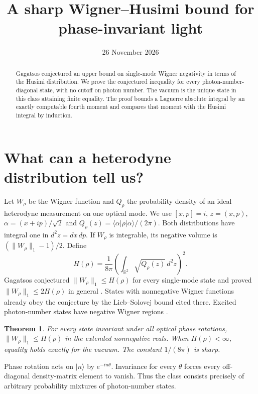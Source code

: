 \documentclass[11pt]{article}
\title{A sharp Wigner--Husimi bound for phase-invariant light}
\date{26 November 2026}
\newtheorem{theorem}{Theorem}
\newcommand{\R}{\mathbb R}
\newcommand{\ket}[1]{\lvert #1\rangle}
\begin{document}
\maketitle
\begin{abstract}
Gagatsos conjectured an upper bound on single-mode Wigner negativity in terms of the Husimi distribution. We prove the conjectured inequality for every photon-number-diagonal state, with no cutoff on photon number. The vacuum is the unique state in this class attaining finite equality. The proof bounds a Laguerre absolute integral by an exactly computable fourth moment and compares that moment with the Husimi integral by induction.
\end{abstract}

\section{What can a heterodyne distribution tell us?}
Let $W_\rho$ be the Wigner function and $Q_\rho$ the probability density of an ideal heterodyne measurement on one optical mode. We use $[x,p]=i$, $z=(x,p)$, $\alpha=(x+ip)/\sqrt{2}$ and $Q_\rho(z)=\langle\alpha|\rho|\alpha\rangle/(2\pi)$. Both distributions have integral one in $d^2z=dx\,dp$. If $W_\rho$ is integrable, its negative volume is $(\|W_\rho\|_1-1)/2$. Define
\[
 H(\rho)=\frac{1}{8\pi}\left(\int_{\R^2}\sqrt{Q_\rho(z)}\,d^2z\right)^2.
\]
Gagatsos conjectured $\|W_\rho\|_1\le H(\rho)$ for every single-mode state and proved $\|W_\rho\|_1\le 2H(\rho)$ in general \cite{gagatsos}. States with nonnegative Wigner functions already obey the conjecture by the Lieb--Solovej bound cited there. Excited photon-number states have negative Wigner regions \cite{kenfack}.

\begin{theorem}
For every state invariant under all optical phase rotations, $\|W_\rho\|_1\le H(\rho)$ in the extended nonnegative reals. When $H(\rho)<\infty$, equality holds exactly for the vacuum. The constant $1/(8\pi)$ is sharp.
\end{theorem}
Phase rotation acts on $\ket n$ by $e^{-in\theta}$. Invariance for every $\theta$ forces every off-diagonal density-matrix element to vanish. Thus the class consists precisely of arbitrary probability mixtures of photon-number states.
\end{document}
